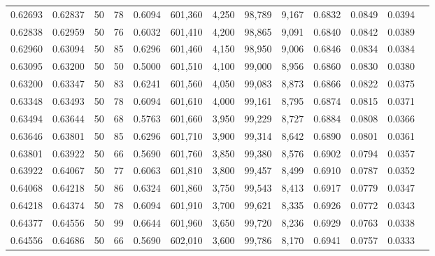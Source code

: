 \begin{tabular}{rrrrrrrrrrrrr}
0.62693 & 0.62837 &    50 &  78 &                                     0.6094 & 601,360 &   4,250 &  98,789 &   9,167 & 0.6832 & 0.0849 & 0.0394 \\
0.62838 & 0.62959 &    50 &  76 &                                     0.6032 & 601,410 &   4,200 &  98,865 &   9,091 & 0.6840 & 0.0842 & 0.0389 \\
0.62960 & 0.63094 &    50 &  85 &                                     0.6296 & 601,460 &   4,150 &  98,950 &   9,006 & 0.6846 & 0.0834 & 0.0384 \\
0.63095 & 0.63200 &    50 &  50 &                                     0.5000 & 601,510 &   4,100 &  99,000 &   8,956 & 0.6860 & 0.0830 & 0.0380 \\
0.63200 & 0.63347 &    50 &  83 &                                     0.6241 & 601,560 &   4,050 &  99,083 &   8,873 & 0.6866 & 0.0822 & 0.0375 \\
0.63348 & 0.63493 &    50 &  78 &                                     0.6094 & 601,610 &   4,000 &  99,161 &   8,795 & 0.6874 & 0.0815 & 0.0371 \\
0.63494 & 0.63644 &    50 &  68 &                                     0.5763 & 601,660 &   3,950 &  99,229 &   8,727 & 0.6884 & 0.0808 & 0.0366 \\
0.63646 & 0.63801 &    50 &  85 &                                     0.6296 & 601,710 &   3,900 &  99,314 &   8,642 & 0.6890 & 0.0801 & 0.0361 \\
0.63801 & 0.63922 &    50 &  66 &                                     0.5690 & 601,760 &   3,850 &  99,380 &   8,576 & 0.6902 & 0.0794 & 0.0357 \\
0.63922 & 0.64067 &    50 &  77 &                                     0.6063 & 601,810 &   3,800 &  99,457 &   8,499 & 0.6910 & 0.0787 & 0.0352 \\
0.64068 & 0.64218 &    50 &  86 &                                     0.6324 & 601,860 &   3,750 &  99,543 &   8,413 & 0.6917 & 0.0779 & 0.0347 \\
0.64218 & 0.64374 &    50 &  78 &                                     0.6094 & 601,910 &   3,700 &  99,621 &   8,335 & 0.6926 & 0.0772 & 0.0343 \\
0.64377 & 0.64556 &    50 &  99 &                                     0.6644 & 601,960 &   3,650 &  99,720 &   8,236 & 0.6929 & 0.0763 & 0.0338 \\
0.64556 & 0.64686 &    50 &  66 &                                     0.5690 & 602,010 &   3,600 &  99,786 &   8,170 & 0.6941 & 0.0757 & 0.0333 \\

\end{tabular}
